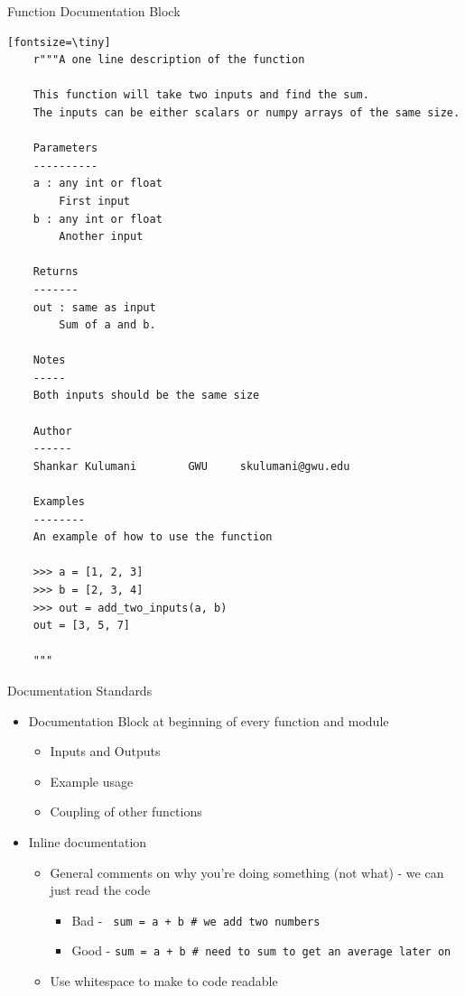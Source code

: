 \documentclass[11pt,professionalfonts]{beamer}
\begin{document}
\begin{frame}[fragile]{Function Documentation Block}
    \begin{verbatim}[fontsize=\tiny]
    r"""A one line description of the function

    This function will take two inputs and find the sum. 
    The inputs can be either scalars or numpy arrays of the same size.

    Parameters
    ----------
    a : any int or float  
        First input
    b : any int or float
        Another input

    Returns
    -------
    out : same as input
        Sum of a and b.

    Notes
    -----
    Both inputs should be the same size

    Author
    ------
    Shankar Kulumani		GWU		skulumani@gwu.edu

    Examples
    --------
    An example of how to use the function

    >>> a = [1, 2, 3]
    >>> b = [2, 3, 4]
    >>> out = add_two_inputs(a, b)
    out = [3, 5, 7]

    """
    \end{verbatim}
\end{frame}
\begin{frame}{Documentation Standards}
    \begin{itemize}
        \item Documentation Block at beginning of every function and module
            \begin{itemize}
                \item Inputs and Outputs
                \item Example usage
                \item Coupling of other functions
            \end{itemize}
        \item Inline documentation
            \begin{itemize}
                \item General comments on why you're doing something (not what) - we can just read the code
                    \begin{itemize}
                        \item Bad - \texttt{ sum = a + b \# we add two numbers}
                        \item Good - \texttt{sum = a + b \# need to sum to get an average later on}
                    \end{itemize}
                \item Use whitespace to make to code readable 
            \end{itemize}
    \end{itemize}
\end{frame}
\end{document}
